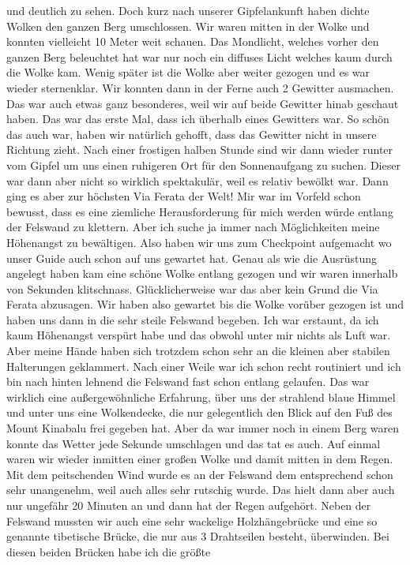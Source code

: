 \documentclass[11pt]{book}
\begin{document}
und deutlich zu sehen. Doch kurz nach unserer Gipfelankunft haben dichte Wolken den ganzen Berg umschlossen. Wir waren mitten in der Wolke 
und konnten vielleicht 10 Meter weit schauen. Das Mondlicht, welches vorher den ganzen Berg beleuchtet hat war nur noch ein diffuses 
Licht welches kaum durch die Wolke kam. Wenig später ist die Wolke aber weiter gezogen und es war wieder sternenklar. Wir konnten 
dann in der Ferne auch 2 Gewitter ausmachen. Das war auch etwas ganz besonderes, weil wir auf beide Gewitter hinab geschaut haben. Das 
war das erste Mal, dass ich überhalb eines Gewitters war. So schön das auch war, haben wir natürlich gehofft, dass das Gewitter 
nicht in unsere Richtung zieht. Nach einer frostigen halben Stunde sind wir dann wieder runter vom Gipfel um uns einen ruhigeren Ort 
für den Sonnenaufgang zu suchen. Dieser war dann aber nicht so wirklich spektakulär, weil es relativ bewölkt war. Dann ging es aber zur 
höchsten Via Ferata der Welt! Mir war im Vorfeld schon bewusst, dass es eine ziemliche Herausforderung für mich werden würde entlang 
der Felswand zu klettern. Aber ich suche ja immer nach Möglichkeiten meine Höhenangst zu bewältigen. Also haben wir uns zum Checkpoint 
aufgemacht wo unser Guide auch schon auf uns gewartet hat. Genau als wie die Ausrüstung angelegt haben kam eine schöne Wolke entlang 
gezogen und wir waren innerhalb von Sekunden klitschnass. Glücklicherweise war das aber kein Grund die Via Ferata abzusagen. Wir haben also 
gewartet bis die Wolke vorüber gezogen ist und haben uns dann in die sehr steile Felswand begeben. Ich war erstaunt, da ich kaum Höhenangst 
verspürt habe und das obwohl unter mir nichts als Luft war. Aber meine Hände haben sich trotzdem schon sehr an die kleinen aber 
stabilen Halterungen geklammert. Nach einer Weile war ich schon recht routiniert und ich bin nach hinten lehnend die Felswand fast schon 
entlang gelaufen. Das war wirklich eine außergewöhnliche Erfahrung, über uns der strahlend blaue Himmel und unter uns eine Wolkendecke, 
die nur gelegentlich den Blick auf den Fuß des Mount Kinabalu frei gegeben hat. Aber da war immer noch in einem Berg waren konnte das 
Wetter jede Sekunde umschlagen und das tat es auch. Auf einmal waren wir wieder inmitten einer großen Wolke und damit mitten in dem Regen.
Mit dem peitschenden Wind wurde es an der Felswand dem entsprechend schon sehr unangenehm, weil auch alles sehr rutschig wurde. Das hielt 
dann aber auch nur ungefähr 20 Minuten an und dann hat der Regen aufgehört. Neben der Felswand mussten wir auch eine sehr wackelige Holzhängebrücke 
und eine so genannte tibetische Brücke, die nur aus 3 Drahtseilen besteht, überwinden. Bei diesen beiden Brücken habe ich die größte 
\end{document}
